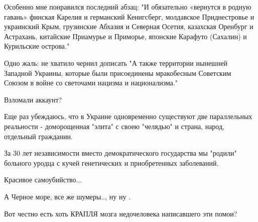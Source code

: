 \begin{itemize}
Особенно мне понравился последний абзац: "И обязательно «вернутся в родную
гавань» финская Карелия и германский Кенигсберг, молдавское Приднестровье и
украинский Крым, грузинские Абхазия и Северная Осетия, казахская Оренбург и
Астрахань, китайские Приамурье и Приморье, японские Карафуто (Сахалин) и
Курильские острова."

Одно жаль: не хватило чернил дописать "А также территории нынешней Западной
Украины, которые были присоединены мракобесным Советским Союзом в войне со
светочами нацизма и национализма."

 
Взломали аккаунт?

 

Еще раз убеждаюсь, что в Украине одновременно существуют две параллельных
реальности - доморощенная "элита" с своею "челядью" и страна, народ, отдельный
гражданин.

За 30 лет независимости вместо демократического государства мы "родили"
больного уродца с кучей генетических и приобретенных заболеваний.

 
Красивое самоубийство...

 
А Черное море, все же шумеры.., ну ну .

 

Вот честно есть хоть КРАПЛЯ мозга недочеловека написавшего эти помои?



\end{itemize}
